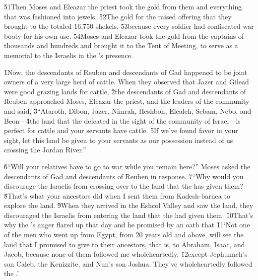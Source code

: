 \v{51}Then Moses and Eleazar the priest took the gold from them and everything that was fashioned into jewels. \v{52}The gold for the raised offering that they brought to the  totaled 16,750 shekels, \v{53}because every soldier had confiscated war booty for his own use. \v{54}Moses and Eleazar took the gold from the captains of thousands and hundreds and brought it to the Tent of Meeting, to serve as a memorial to the Israelis in the 's presence.

\v{1}Now, the descendants of Reuben and descendants of Gad happened to be joint owners of a very large herd of cattle. When they observed that Jazer and Gilead were good grazing lands for cattle, \v{2}the descendants of Gad and descendants of Reuben approached Moses, Eleazar the priest, and the leaders of the community and said, \v{3}``Ataroth, Dibon, Jazer, Nimrah, Heshbon, Elealeh, Sebam, Nebo, and Beon---\v{4}the land that the  defeated in the sight of the community of Israel---is perfect for cattle and your servants have cattle. \v{5}If we've found favor in your sight, let this land be given to your servants as our possession instead of us crossing the Jordan River.''

\v{6}``Will your relatives have to go to war while you remain here?'' Moses asked the descendants of Gad and descendants of Reuben in response. \v{7}``Why would you discourage the Israelis from crossing over to the land that the  has given them? \v{8}That's what your ancestors did when I sent them from Kadesh-barnea to explore the land. \v{9}When they arrived in the Eshcol Valley and saw the land, they discouraged the Israelis from entering the land that the  had given them. \v{10}That's why the 's anger flared up that day and he promised by an oath that \v{11}`Not one of the men who went up from Egypt, from 20 years old and above, will see the land that I promised to give to their ancestors, that is, to Abraham, Isaac, and Jacob, because none of them followed me wholeheartedly, \v{12}except Jephunneh's son Caleb, the Kenizzite, and Nun's son Joshua. They've wholeheartedly followed the .'

